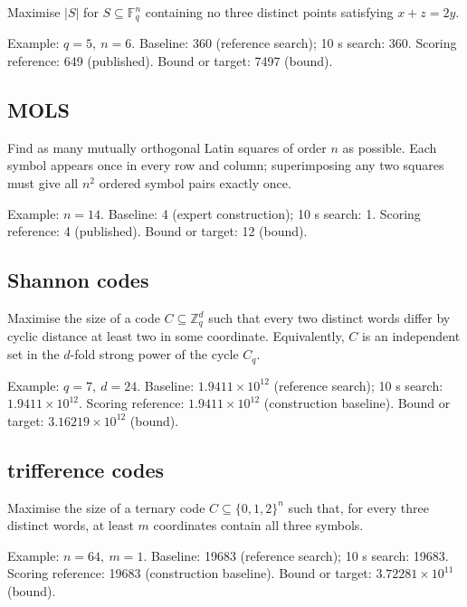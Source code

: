 Maximise $|S|$ for $S\subseteq\mathbb F_q^n$ containing no three distinct points satisfying $x+z=2y$.

Example: $q=5,\ n=6$. Baseline: 360 (reference search); 10 s search: 360. Scoring reference: 649 (published). Bound or target: 7497 (bound).

\subsection{MOLS}

Find as many mutually orthogonal Latin squares of order $n$ as possible. Each symbol appears once in every row and column; superimposing any two squares must give all $n^2$ ordered symbol pairs exactly once.

Example: $n=14$. Baseline: 4 (expert construction); 10 s search: 1. Scoring reference: 4 (published). Bound or target: 12 (bound).

\subsection{Shannon codes}

Maximise the size of a code $C\subseteq\mathbb Z_q^d$ such that every two distinct words differ by cyclic distance at least two in some coordinate. Equivalently, $C$ is an independent set in the $d$-fold strong power of the cycle $C_q$.

Example: $q=7,\ d=24$. Baseline: $1.9411\times10^{12}$ (reference search); 10 s search: $1.9411\times10^{12}$. Scoring reference: $1.9411\times10^{12}$ (construction baseline). Bound or target: $3.16219\times10^{12}$ (bound).

\subsection{trifference codes}

Maximise the size of a ternary code $C\subseteq\{0,1,2\}^n$ such that, for every three distinct words, at least $m$ coordinates contain all three symbols.

Example: $n=64,\ m=1$. Baseline: 19683 (reference search); 10 s search: 19683. Scoring reference: 19683 (construction baseline). Bound or target: $3.72281\times10^{11}$ (bound).
